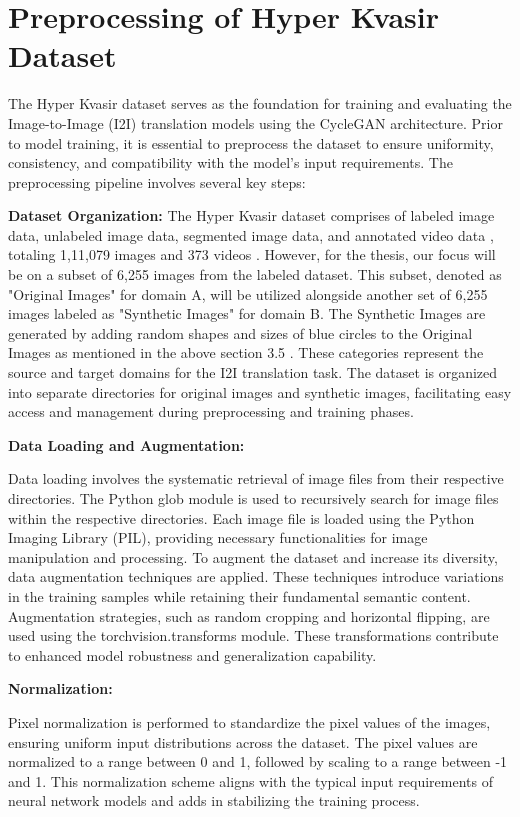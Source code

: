 \documentclass[UKenglish,12pt]{master-style}
\begin{document}
\section{Preprocessing of Hyper Kvasir Dataset}

The Hyper Kvasir dataset serves as the foundation for training and evaluating the Image-to-Image (I2I) translation models using the CycleGAN architecture. Prior to model training, it is essential to preprocess the dataset to ensure uniformity, consistency, and compatibility with the model's input requirements. The preprocessing pipeline involves several key steps:

\textbf{{Dataset Organization:}}
The Hyper Kvasir dataset comprises of labeled image data, unlabeled image data, segmented image data, and annotated video data , totaling 1,11,079 images and 373 videos \cite{HyperKvasir_Dataset}. However, for the thesis, our focus will be on a subset of 6,255 images from the labeled dataset. This subset, denoted as "Original Images" for domain A, will be utilized alongside another set of 6,255 images labeled as "Synthetic Images" for domain B. The Synthetic Images are generated by adding random shapes and sizes of blue circles to the Original Images as mentioned in the above section 3.5 . These categories represent the source and target domains for the I2I translation task. The dataset is organized into separate directories for original images and synthetic images, facilitating easy access and management during preprocessing and training phases.

\textbf{{Data Loading and Augmentation:}}

Data loading involves the systematic retrieval of image files from their respective directories. The Python glob module is used to recursively search for image files within the respective directories. Each image file is loaded using the Python Imaging Library (PIL), providing necessary functionalities for image manipulation and processing. To augment the dataset and increase its diversity, data augmentation techniques are applied. These techniques introduce variations in the training samples while retaining their fundamental semantic content.
Augmentation strategies, such as random cropping and horizontal flipping, are used using the torchvision.transforms module. These transformations contribute to enhanced model robustness and generalization capability.

\textbf{{Normalization:}}

Pixel normalization is performed to standardize the pixel values of the images, ensuring uniform input distributions across the dataset. The pixel values are normalized to a range between 0 and 1, followed by scaling to a range between -1 and 1. This normalization scheme aligns with the typical input requirements of neural network models and adds in stabilizing the training process.
\end{document}
